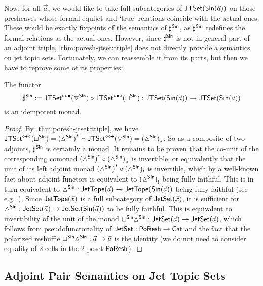 \documentclass[a4paper]{memoir}
\begin{document}
{Now, for all $\vec a$, we would like to take full subcategories of $\mathsf{JTSet}({\mathsf{Sin}}(\vec a))$ on those presheaves whose formal equijet and `true' relations coincide with the actual ones.
These would be exactly fixpoints of the semantics of $\sharp^{\mathsf{Sin}}$, as $\sharp^{\mathsf{Sin}}$ redefines the formal relations as the actual ones.
However, since $\sharp^{\mathsf{Sin}}$ is not in general part of an adjoint triple, \cref{thm:poresh-jtset:triple} does not directly provide a semantics on jet topic sets.
Fortunately, we can reassemble it from its parts, but then we have to reprove some of its properties:
\begin{proposition}
	The functor
	\[
		{\bar \sharp}^{\mathsf{Sin}} := \mathsf{JTSet}^{\circ \circ \bullet}({\triangledown}^{\mathsf{Sin}}) \circ \mathsf{JTSet}^{\circ \bullet \circ}({\sqcup}^{\mathsf{Sin}}) : \mathsf{JTSet}({\mathsf{Sin}}(\vec a)) \to \mathsf{JTSet}({\mathsf{Sin}}(\vec a))
	\]
	is an idempotent monad.
\end{proposition}
\begin{proof}
	By \cref{thm:poresh-jtset:triple}, we have $\mathsf{JTSet}^{\circ \bullet \circ}({\sqcup}^{\mathsf{Sin}}) = {({\vartriangle}^{\mathsf{Sin}})}^* \dashv \mathsf{JTSet}^{\circ \circ \bullet}({\triangledown}^{\mathsf{Sin}}) = {({\vartriangle}^{\mathsf{Sin}})}_*$.
	So as a composite of two adjoints, ${\bar \sharp}^{\mathsf{Sin}}$ is certainly a monad.
	It remains to be proven that the co-unit of the corresponding comonad ${({\vartriangle}^{\mathsf{Sin}})}^* \circ {({\vartriangle}^{\mathsf{Sin}})}_*$ is invertible,
	or equivalently that the unit of its left adjoint monad ${({\vartriangle}^{\mathsf{Sin}})}^* \circ {({\vartriangle}^{\mathsf{Sin}})}_!$ is invertible,
	which by a well-known fact about adjoint functors \cite[v141, prop.\ 3.4]{nlab:adjoint-functor} is equivalent to ${({\vartriangle}^{\mathsf{Sin}})}_!$ being fully faithful.
	This is in turn equivalent to ${\vartriangle}^{\mathsf{Sin}} : \mathsf{JetTope}(\vec a) \to \mathsf{JetTope}({\mathsf{Sin}}(\vec a))$ being fully faithful (see e.g.\ \cite[v4, thm.\ 2.3.4]{transpension-techreport}).
	Since $\mathsf{JetTope}(\vec x)$ is a full subcategory of $\mathsf{JetSet}(\vec x)$,
	it is sufficient for ${\vartriangle}^{\mathsf{Sin}} : \mathsf{JetSet}(\vec a) \to \mathsf{JetSet}({\mathsf{Sin}}(\vec a))$ to be fully faithful.
	This is equivalent to invertibility of the unit of the monad ${\sqcup}^{\mathsf{Sin}} {\vartriangle}^{\mathsf{Sin}} : \mathsf{JetSet}(\vec a) \to \mathsf{JetSet}(\vec a)$, which follows from pseudofunctoriality of $\mathsf{JetSet} : \mathsf{PoResh} \to {\mathsf{Cat}}$ and the fact that the polarized reshuffle ${\sqcup}^{\mathsf{Sin}} {\vartriangle}^{\mathsf{Sin}} : \vec a \to \vec a$ is the identity (we do not need to consider equality of 2-cells in the 2-poset $\mathsf{PoResh}$).
\end{proof}

\subsection{Adjoint Pair Semantics on Jet Topic Sets} \label{sec:poresh-jtset:pair}
} %
\end{document}
